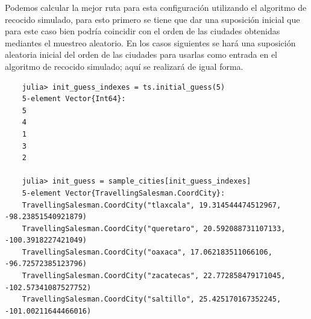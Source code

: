 Podemos calcular la mejor ruta para esta configuración utilizando el algoritmo de recocido simulado, para esto primero se tiene que dar una suposición inicial que para este caso bien podría coincidir con el orden de las ciudades obtenidas mediantes el muestreo aleatorio. En los casos siguientes se hará una suposición aleatoria inicial del orden de las ciudades para usarlas como entrada en el algoritmo de recocido simulado; aquí se realizará de igual forma.
\begin{verbatim}
    julia> init_guess_indexes = ts.initial_guess(5)
    5-element Vector{Int64}:
    5
    4
    1
    3
    2

    julia> init_guess = sample_cities[init_guess_indexes]
    5-element Vector{TravellingSalesman.CoordCity}:
    TravellingSalesman.CoordCity("tlaxcala", 19.314544474512967, -98.23851540921879)
    TravellingSalesman.CoordCity("queretaro", 20.592088731107133, -100.3918227421049)
    TravellingSalesman.CoordCity("oaxaca", 17.062183511066106, -96.72572385123796)
    TravellingSalesman.CoordCity("zacatecas", 22.772858479171045, -102.57341087527752)
    TravellingSalesman.CoordCity("saltillo", 25.425170167352245, -101.00211644466016)
\end{verbatim}


